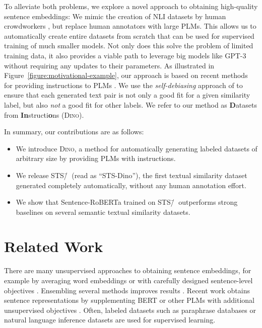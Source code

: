 \documentclass[11pt]{article}
\newcommand\ours{\textsc{Dino}}
\newcommand\oursFullHl{\textbf{D}atasets from \textbf{In}structi\textbf{o}ns}
\newcommand\ourDs{STS\=/🦕}
\begin{document}
To alleviate both problems, we explore a
novel 
approach to obtaining high-quality sentence embeddings:
We 
mimic
the creation of NLI datasets  by
human
crowdworkers \citep{bowman-etal-2015-large,williams2018mnli},
but replace human annotators
with large PLMs. This allows us to automatically create
entire datasets from scratch that can be used for supervised
training of much smaller models. Not only does this solve
the problem of limited training data, it also provides a
viable path to leverage big models like
GPT-3 \citep{brown2020language} without requiring any
updates to their parameters. As illustrated in
Figure~\ref{figure:motivational-example}, our approach is
based on recent methods for providing instructions to
PLMs \citep[e.g.,][]{radford2018language,brown2020language,schick2020fewshot,schick2020exploiting}. We
use the \emph{self-debiasing} approach
of \citet{schick2021selfdiagnosis} to ensure that each
generated text pair is not only a good fit for a given
similarity label, but also \emph{not} a good fit for other
labels. We refer to our method as \oursFullHl{} (\ours{}).

In summary, our contributions are as follows:
\begin{itemize} 
\item We introduce \ours{}, a method for automatically generating labeled datasets of arbitrary size by providing PLMs with instructions.
\item We release \ourDs{} (read as ``STS-Dino''), the
first textual similarity dataset generated
completely automatically,
without any human annotation effort.
\item We show that Sentence-RoBERTa \citep{reimers-gurevych-2019-sentence} trained on \ourDs{} outperforms strong baselines on several semantic textual similarity datasets.
\end{itemize}

\section{Related Work}

There are many unsupervised approaches to obtaining sentence
embeddings, for example by averaging word
embeddings \citep{mikolov2013word2vec,Glove,bojanowski2017enriching}
or with carefully designed sentence-level
objectives \citep{pmlr-v32-le14,NIPS2015_f442d33f}.
Ensembling several methods improves results
\citep{porner19domainadapt,porner20meta}.
Recent work obtains sentence representations by supplementing BERT \citep{devlin2018bert} or other PLMs with additional unsupervised objectives \citep{zhang-etal-2020-unsupervised,li-etal-2020-sentence,wu2020clear,giorgi2020declutr}. Often, labeled datasets such as paraphrase databases \citep{wieting-gimpel-2018-paranmt} or natural language inference datasets \citep{conneau-etal-2017-supervised,cer-etal-2018-universal,reimers-gurevych-2019-sentence} are used for supervised learning.
\end{document}

